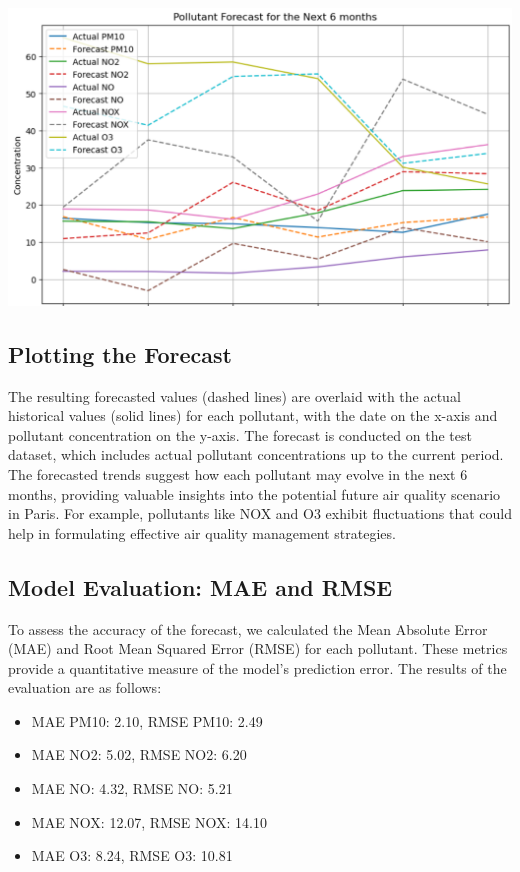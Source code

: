\documentclass{modeleRapport}
\begin{document}
\begin{center}
    \includegraphics[width=14cm]{Images/PollutantsForecast.png}
\end{center}

\newpage
\subsection{Plotting the Forecast}
The resulting forecasted values (dashed lines) are overlaid with the actual historical values (solid lines) for each pollutant, 
with the date on the x-axis and pollutant concentration on the y-axis. The forecast is conducted on the test dataset, 
which includes actual pollutant concentrations up to the current period.\\

The forecasted trends suggest how each pollutant may evolve in the next 6 months, providing valuable insights into the 
potential future air quality scenario in Paris. For example, pollutants like NOX and O3 exhibit fluctuations that could help 
in formulating effective air quality management strategies.\\

\subsection{Model Evaluation: MAE and RMSE}

To assess the accuracy of the forecast, we calculated the Mean Absolute Error (MAE) and Root Mean Squared Error (RMSE) 
for each pollutant. These metrics provide a quantitative measure of the model's prediction error. The results of the 
evaluation are as follows:\\

\begin{itemize}
    \item MAE PM10: 2.10, RMSE PM10: 2.49
    \item MAE NO2: 5.02, RMSE NO2: 6.20
    \item MAE NO: 4.32, RMSE NO: 5.21
    \item MAE NOX: 12.07, RMSE NOX: 14.10
    \item MAE O3: 8.24, RMSE O3: 10.81
\end{itemize}
\end{document}
